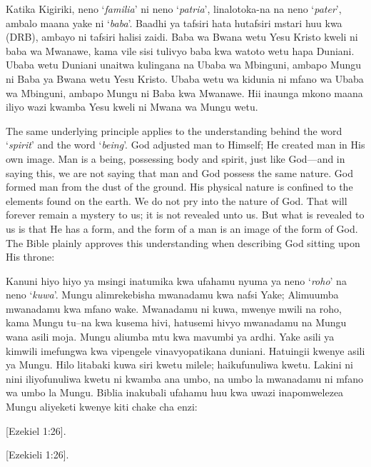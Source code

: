 Katika Kigiriki, neno ‘\textit{familia}’ ni neno ‘\textit{patria}’, linalotoka-na na neno ‘\textit{pater}’, ambalo maana yake ni ‘\textit{baba}’. Baadhi ya tafsiri hata hutafsiri mstari huu kwa  (DRB), ambayo ni tafsiri halisi zaidi. Baba wa Bwana wetu Yesu Kristo kweli ni baba wa Mwanawe, kama vile sisi tulivyo baba kwa watoto wetu hapa Duniani. Ubaba wetu Duniani unaitwa kulingana na Ubaba wa Mbinguni, ambapo Mungu ni Baba ya Bwana wetu Yesu Kristo. Ubaba wetu wa kidunia ni mfano wa Ubaba wa Mbinguni, ambapo Mungu ni Baba kwa Mwanawe. Hii inaunga mkono maana iliyo wazi kwamba Yesu kweli ni Mwana wa Mungu wetu.


The same underlying principle applies to the understanding behind the word ‘\textit{spirit}’ and the word ‘\textit{being}’. God adjusted man to Himself; He created man in His own image. Man is a being, possessing body and spirit, just like God—and in saying this, we are not saying that man and God possess the same nature. God formed man from the dust of the ground. His physical nature is confined to the elements found on the earth. We do not pry into the nature of God. That will forever remain a mystery to us; it is not revealed unto us. But what is revealed to us is that He has a form, and the form of a man is an image of the form of God. The Bible plainly approves this understanding when describing God sitting upon His throne:


Kanuni hiyo hiyo ya msingi inatumika kwa ufahamu nyuma ya neno ‘\textit{roho}’ na neno ‘\textit{kuwa}’. Mungu alimrekebisha mwanadamu kwa nafsi Yake; Alimuumba mwanadamu kwa mfano wake. Mwanadamu ni kuwa, mwenye mwili na roho, kama Mungu tu--na kwa kusema hivi, hatusemi hivyo mwanadamu na Mungu wana asili moja. Mungu aliumba mtu kwa mavumbi ya ardhi. Yake asili ya kimwili imefungwa kwa vipengele vinavyopatikana duniani. Hatuingii kwenye asili ya Mungu. Hilo litabaki kuwa siri kwetu milele; haikufunuliwa kwetu. Lakini ni nini iliyofunuliwa kwetu ni kwamba ana umbo, na umbo la mwanadamu ni mfano wa umbo la Mungu. Biblia inakubali ufahamu huu kwa uwazi inapomwelezea Mungu aliyeketi kwenye kiti chake cha enzi:


[Ezekiel 1:26].


[Ezekieli 1:26].


